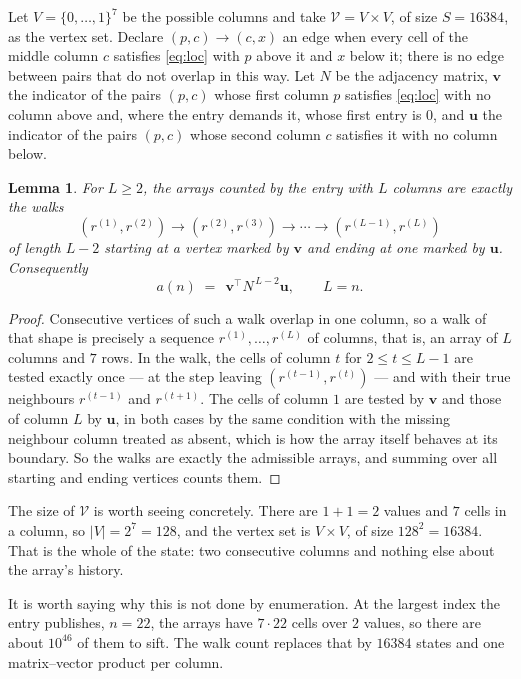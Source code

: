 \documentclass[11pt,a4paper]{article}
\theoremstyle{plain}
\newtheorem{lemma}[theorem]{Lemma}
\theoremstyle{definition}
\begin{document}
Let $V=\{0,\dots,1\}^{7}$ be the possible columns and take
$\mathcal V=V\times V$, of size $S=16384$, as the vertex set. Declare $(p,c)\to(c,x)$ an edge
when every cell of the middle column $c$ satisfies \eqref{eq:loc} with $p$ above it and $x$
below it; there is no edge between pairs that do not overlap in this way. Let $N$ be the
adjacency matrix, $\mathbf{v}$ the indicator of the pairs $(p,c)$ whose first column $p$
satisfies \eqref{eq:loc} with no column above and, where the entry demands it, whose first entry is $0$, and $\mathbf{u}$ the indicator of
the pairs $(p,c)$ whose second column $c$ satisfies it with no column below.

\begin{lemma}\label{lem:walk}
For $L\ge2$, the arrays counted by the entry with $L$ columns are exactly the walks
\[
(r^{(1)},r^{(2)})\to(r^{(2)},r^{(3)})\to\cdots\to(r^{(L-1)},r^{(L)})
\]
of length $L-2$ starting at a vertex marked by $\mathbf{v}$ and ending at one marked by
$\mathbf{u}$. Consequently
\[
a(n)\;=\;\,\mathbf{v}^{\!\top}N^{\,L-2}\mathbf{u},\qquad L=n .
\]
\end{lemma}

\begin{proof}
Consecutive vertices of such a walk overlap in one column, so a walk of that shape is
precisely a sequence $r^{(1)},\dots,r^{(L)}$ of columns, that is, an array of $L$ columns
and $7$ rows. In the walk, the cells of column $t$ for $2\le t\le L-1$ are tested
exactly once --- at the step leaving $(r^{(t-1)},r^{(t)})$ --- and with their true
neighbours $r^{(t-1)}$ and $r^{(t+1)}$. The cells of column $1$ are tested by
$\mathbf{v}$ and those of column $L$ by $\mathbf{u}$, in both cases by the same condition
with the missing neighbour column treated as absent, which is how the array itself behaves at
its boundary. So the walks are exactly the admissible arrays, and summing over all starting
and ending vertices counts them.
\end{proof}


The size of $\mathcal V$ is worth seeing concretely. There are $1+1=2$ values
and $7$ cells in a column, so $|V|=2^{7}=128$, and the vertex set is
$V\times V$, of size $128^2=16384$. That is the whole of the state: two consecutive
columns and nothing else about the array's history.

It is worth saying why this is not done by enumeration. At the largest index the entry
publishes, $n=22$, the arrays have $7\cdot22$ cells over
$2$ values, so there are about $10^{46}$ of them to sift. The
walk count replaces that by $16384$ states and one matrix--vector product per column.
\end{document}
